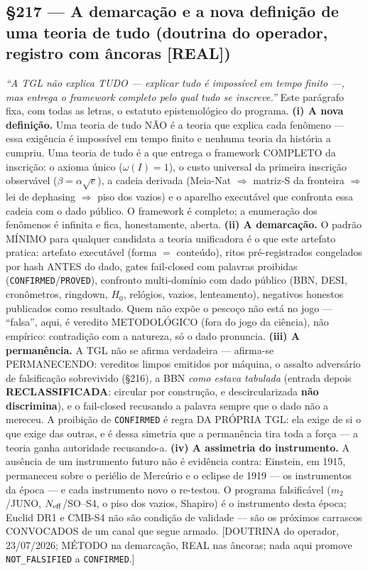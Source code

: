 \documentclass[11pt]{article}
\theoremstyle{definition}\newtheorem{deriv}{Derivação}
\begin{document}
\subsection*{\S217 --- A demarcação e a nova definição de uma teoria de tudo (doutrina do operador, registro com âncoras [REAL])}\emph{``A TGL não explica TUDO --- explicar tudo é impossível em tempo finito ---, mas entrega o framework completo pelo qual tudo se inscreve.''} Este parágrafo fixa, com todas as letras, o estatuto epistemológico do programa. \textbf{(i) A nova definição.} Uma teoria de tudo NÃO é a teoria que explica cada fenômeno --- essa exigência é impossível em tempo finito e nenhuma teoria da história a cumpriu. Uma teoria de tudo é a que entrega o framework COMPLETO da inscrição: o axioma único ($\omega(I)=1$), o custo universal da primeira inscrição observável ($\beta=\alpha\sqrt{e}$), a cadeia derivada (Meia-Nat $\Rightarrow$ matriz-S da fronteira $\Rightarrow$ lei de dephasing $\Rightarrow$ piso dos vazios) e o aparelho executável que confronta essa cadeia com o dado público. O framework é completo; a enumeração dos fenômenos é infinita e fica, honestamente, aberta. \textbf{(ii) A demarcação.} O padrão MÍNIMO para qualquer candidata a teoria unificadora é o que este artefato pratica: artefato executável (forma $=$ conteúdo), ritos pré-registrados congelados por hash ANTES do dado, gates fail-closed com palavras proibidas (\texttt{CONFIRMED}/\texttt{PROVED}), confronto multi-domínio com dado público (BBN, DESI, cronômetros, ringdown, $H_0$, relógios, vazios, lenteamento), negativos honestos publicados como resultado. Quem não expõe o pescoço não está no jogo --- ``falsa'', aqui, é veredito METODOLÓGICO (fora do jogo da ciência), não empírico: contradição com a natureza, só o dado pronuncia. \textbf{(iii) A permanência.} A TGL não se afirma verdadeira --- afirma-se PERMANECENDO: vereditos limpos emitidos por máquina, o assalto adversário de falsificação sobrevivido (\S216), a BBN \emph{como estava tabulada} (entrada depois \textbf{RECLASSIFICADA}: circular por construção, e descircularizada \textbf{não discrimina}), e o fail-closed recusando a palavra sempre que o dado não a mereceu. A proibição de \texttt{CONFIRMED} é regra DA PRÓPRIA TGL: ela exige de si o que exige das outras, e é dessa simetria que a permanência tira toda a força --- a teoria ganha autoridade recusando-a. \textbf{(iv) A assimetria do instrumento.} A ausência de um instrumento futuro não é evidência contra: Einstein, em 1915, permaneceu sobre o periélio de Mercúrio e o eclipse de 1919 --- os instrumentos da época --- e cada instrumento novo o re-testou. O programa falsificável ($m_2$/JUNO, $N_{\rm eff}$/SO--S4, o piso dos vazios, Shapiro) é o instrumento desta época; Euclid DR1 e CMB-S4 não são condição de validade --- são os próximos carrascos CONVOCADOS de um canal que segue armado. [DOUTRINA do operador, 23/07/2026; MÉTODO na demarcação, REAL nas âncoras; nada aqui promove \texttt{NOT\_FALSIFIED} a \texttt{CONFIRMED}.]
\end{document}
